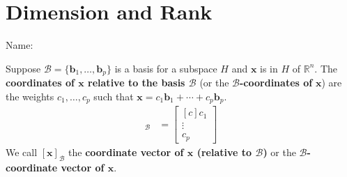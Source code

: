 \documentclass[10pt]{book}
\newcommand{\boxcolor}{gray!30}
\newenvironment{boxdef}{\begin{mdframed}[backgroundcolor=\boxcolor,linewidth=0pt,nobreak=true]}{\end{mdframed}}
\theoremstyle{definition}
\newcommand{\name}[1][2.5in]{\vspace{-2.3em}\hfill Name: \underline{\hspace{#1}}}
\newcommand{\B}{\mathscr{B}}
\newcommand{\vect}[1]{\ensuremath{\boldsymbol{\mathbf{#1}}}}
\newcommand{\vectset}[3][v]{\{\vect{#1}_{#2},\ldots,\vect{#1}_{#3}\}}
\newcommand{\vectB}[1][x]{[\vect{#1}]_\B}
\begin{document}
\newpage

\section{Dimension and Rank}
\name

\begin{boxdef}
	Suppose $\B=\vectset[b]{1}{p}$ is a basis for a subspace $H$ and $\vect{x}$ is in $H$ of $\mathbb{R}^n$. The \textbf{coordinates of $\boldsymbol{\vect{x}}$ relative to the basis $\boldsymbol{\B}$} (or the $\boldsymbol{\B}$\textbf{-coordinates of} $\boldsymbol{\vect{x}}$) are the weights $c_1,\ldots,c_p$ such that $\vect{x} = c_1\vect{b}_1 + \cdots + c_p\vect{b}_p$.
	\begin{align*}
	\vectB &= \begin{bmatrix}[c]c_1 \\ \vdots \\ c_p\end{bmatrix}
	\end{align*}
	We call $\vectB$ the \textbf{coordinate vector of $\boldsymbol{\vect{x}}$ (relative to $\boldsymbol{\B}$)} or the \textbf{$\boldsymbol{\B}$-coordinate vector of $\boldsymbol{\vect{x}}$}.
\end{boxdef}
\end{document}
